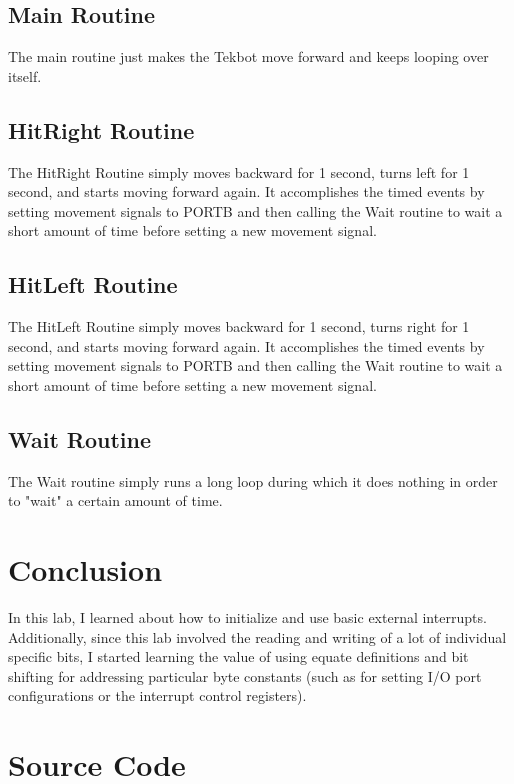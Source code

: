 \documentclass[12pt,letterpaper]{article}
\begin{document}
\subsection{Main Routine}

The main routine just makes the Tekbot move forward and keeps looping over
itself.

\subsection{HitRight Routine}

The HitRight Routine simply moves backward for 1 second, turns left for 1
second, and starts moving forward again.  It accomplishes the timed events by
setting movement signals to PORTB and then calling the Wait routine to wait a
short amount of time before setting a new movement signal.

\subsection{HitLeft Routine}

The HitLeft Routine simply moves backward for 1 second, turns right for 1
second, and starts moving forward again.  It accomplishes the timed events by
setting movement signals to PORTB and then calling the Wait routine to wait a
short amount of time before setting a new movement signal.

\subsection{Wait Routine}

The Wait routine simply runs a long loop during which it does nothing in order
to "wait" a certain amount of time.

\section{Conclusion}

In this lab, I learned about how to initialize and use basic external
interrupts.  Additionally, since this lab involved the reading and writing of a
lot of individual specific bits, I started learning the value of using equate
definitions and bit shifting for addressing particular byte constants (such as
for setting I/O port configurations or the interrupt control registers).

\section{Source Code}

\begin{verbatim}

\end{verbatim}
\end{document}
